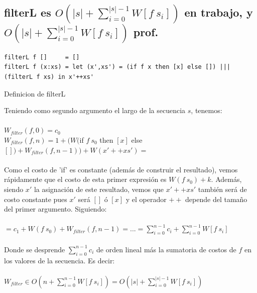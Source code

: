 \documentclass[12pt]{article}
\begin{document}
\subsection{filterL es $O(|s| + \sum\limits_{i=0}^{|s|-1} W[f\ s_i])$ en trabajo, y $O(|s| + \sum\limits_{i=0}^{|s|-1} W[f\ s_i])$ prof.}

\begin{table}[h]
\begin{lstlisting}
filterL f []     = []
filterL f (x:xs) = let (x',xs') = (if f x then [x] else []) ||| (filterL f xs) in x'++xs'
\end{lstlisting}
\caption{Definicion de filterL}
\end{table}
\begin{itemize}

 
\end{itemize}

Teniendo como segundo argumento el largo de la secuencia $s$, tenemos: \\
\\
    $W_{filter}(f, 0) = c_0$ \\
    $W_{filter}(f, n) = 1 + ( W($if $f\ s_0$ then $[x]$ else $[]) + W_{filter}(f, n-1) ) + W(x'++xs') = $ \\
\\
    Como el costo de 'if' es constante (además de construir el resultado), vemos rápidamente que el costo de esta primer expresión es $W(f\ s_0) + k$.
    Además, siendo $x'$ la asignación de este resultado, vemos que $x'++xs'$ también será de costo constante pues $x'$ será $[]$ ó $[x]$ y el operador $++$ depende del tamaño del primer argumento. Siguiendo:\\
\\
    $ = c_1 + W(f\ s_0) + W_{filter}(f, n-1) = ... = \sum\limits_{i=0}^{n-1} c_i + \sum\limits_{i=0}^{n-1} W[f\ s_i] $ \\
\\
    Donde se desprende $\sum\limits_{i=0}^{n-1} c_i$ de orden lineal más la sumatoria de costos de $f$ en los valores de la secuencia. Es decir: \\
\\
    $W_{filter} \in O(n + \sum\limits_{i=0}^{n-1} W[f\ s_i] ) = O(|s| + \sum\limits_{i=0}^{|s|-1} W[f\ s_i])$\\
\end{document}
